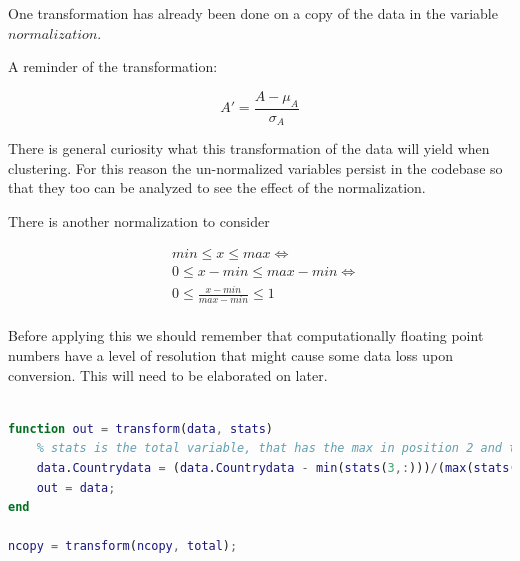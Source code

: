 \documentclass[12pt, a4paper]{article}
\begin{document}
One transformation has already been done on a copy of the data in the variable $normalization$.
\newline

A reminder of the transformation:

\begin{equation*}
    A' = \frac{A-\mu_A}{\sigma_A}
\end{equation*}

There is general curiosity what this transformation of the data will yield when clustering. For this reason the un-normalized variables persist in the codebase so that they too can be analyzed to see the effect of the normalization.
\newline

There is another normalization to consider

\begin{equation*}
    \begin{split}
        & min \leq x \leq max \iff \\
        & 0 \leq x-min \leq max - min \iff \\
        & 0 \leq \frac{x-min}{max-min} \leq 1 \\
    \end{split}
\end{equation*}

Before applying this we should remember that computationally floating point numbers have a level of resolution that might cause some data loss upon conversion. This will need to be elaborated on later.

\begin{lstlisting}[language=Matlab, label=lst:datatransform, caption=The code that implements the data transfromation in the range $0$ to $1$.]
% Data transform

function out = transform(data, stats)
    % stats is the total variable, that has the max in position 2 and the min in position 3
    data.Countrydata = (data.Countrydata - min(stats(3,:)))/(max(stats(2,:))-min(stats(3,:)));
    out = data;
end

ncopy = transform(ncopy, total);
\end{lstlisting}
\end{document}
